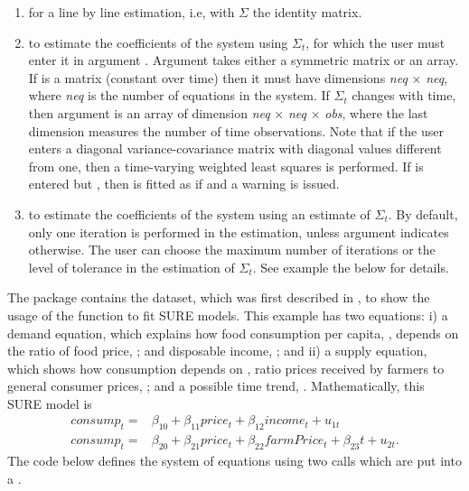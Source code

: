 \begin{enumerate}
\item  {} for a line by line estimation, i.e, with $\Sigma$ the identity matrix. 
\item  {} to estimate the coefficients of the system using $\Sigma_t$, for which the user must enter it in argument . Argument  takes either a symmetric matrix or an array. If  is a matrix (constant over time) then it must have dimensions \emph{neq} $\times$ \emph{neq}, where \emph{neq} is the number of equations in the system. If $\Sigma_t$ changes with time, then argument  is an array of dimension \emph{neq} $\times$ \emph{neq} $\times$ \emph{obs}, where the last dimension measures the number of time observations. Note that if the user enters a diagonal variance-covariance matrix with diagonal values different from one, then a time-varying weighted least squares is performed. If  is entered but , then  is fitted as if  and a warning is issued.
\item {} to estimate the coefficients of the system using an estimate of $\Sigma_t$. By default, only one iteration is performed in the estimation, unless argument  indicates otherwise. The user can choose the maximum number of iterations or the level of tolerance in the estimation of $\Sigma_t$. See example the below for details.
\end{enumerate}

The package  contains the  dataset, which was first described in \citet{Kmenta1986}, to show the usage of the function  to fit SURE models. This example has two equations: i) a demand equation, which explains how food consumption per capita, , depends on the ratio of food price, ; and disposable income, ; and ii) a supply equation, which shows how consumption depends on , ratio prices received by farmers to general consumer prices, ; and  a possible time trend, . Mathematically, this SURE model is
\begin{align}
consump_t = &\beta_{10} + \beta_{11} price_t + \beta_{12} income_t  + u_{1t}\nonumber\\
consump_t = &\beta_{20} + \beta_{21} price_t+ \beta_{22} farmPrice_t  +\beta_{23} t+  u_{2t}.
\label{eq:Kmenta}
\end{align}
The code below defines the system of equations using two  calls which are put into a . 

